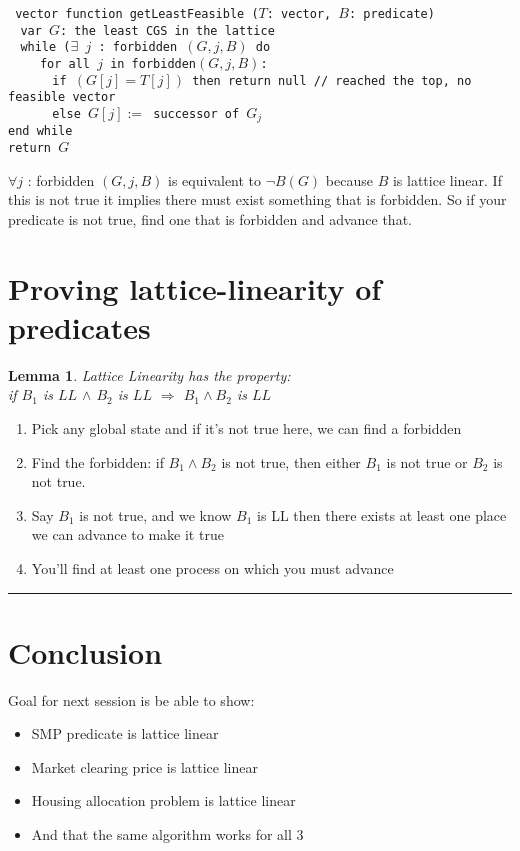 \documentclass[twoside]{article}
\newtheorem{lemma}[theorem]{Lemma}
\newenvironment{proof}{{\bf Proof:}}{\hfill\rule{2mm}{2mm}}
\begin{document}
\texttt{
vector function getLeastFeasible ($T$: vector, $B$: predicate)\\
$~~~~$var $G$: the least CGS in the lattice \\
$~~~~$while ($\exists$ $j$ : forbidden $(G, j, B)$ do\\
$~~~~ ~~~~$ for all $j$ in forbidden$(G, j, B)$:\\
$~~~~ ~~~~ ~~~~$ if $(G[j] = T[j])$ then return null // reached the top, no feasible vector \\
$~~~~ ~~~~ ~~~~$ else $G[j] := $ successor of $G_j$\\
end while\\
return $G$
}

$\forall j$ : forbidden $(G, j, B)$ is equivalent to $\neg B(G)$ because $B$ is lattice linear. If this is not true it implies there must exist something that is forbidden. So if your predicate is not true, find one that is forbidden and advance that.

\section{Proving lattice-linearity of predicates}

\begin{lemma}
Lattice Linearity has the property:\\
if $B_1$ is $LL$ $\land$ $B_2$ is $LL$ $\Rightarrow$ $B_1 \land B_2$ is $LL$
\end{lemma}

\begin{proof}
\begin{enumerate}
    \item Pick any global state and if it's not true here, we can find a forbidden
    \item Find the forbidden: if $B_1 \land B_2$ is not true, then either $B_1$ is not true or $B_2$ is not true.
    \item Say $B_1$ is not true, and we know $B_1$ is LL then there exists at least one place we can advance to make it true
    
    \item You'll find at least one process on which you must advance
\end{enumerate}

\end{proof}

\section{Conclusion}

Goal for next session is be able to show:
\begin{itemize}
\item SMP predicate is lattice linear
\item Market clearing price is lattice linear
\item Housing allocation problem is lattice linear
\item And that the same algorithm works for all 3
\end{itemize}
\end{document}
